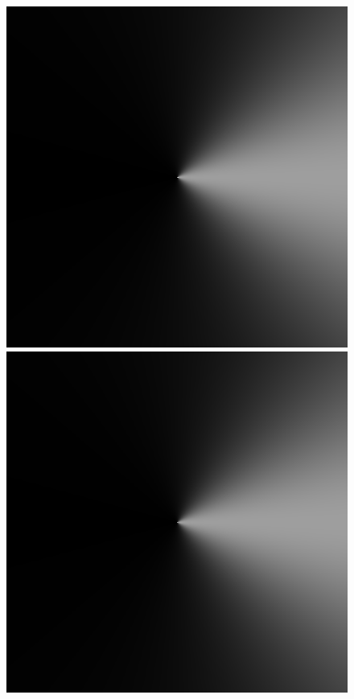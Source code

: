 \begin{figure}
{ }
 \hfill
 \subtop
 {
 \includegraphics[scale=0.115]{figures/donelan_dfilt_wr_sqrt50.png}
 }
 \hfill
 \subtop
 {
 \includegraphics[scale=0.115]{figures/donelan_dfilt_wr_sqrt200.png}
}
\end{figure}
